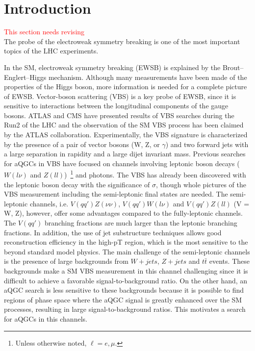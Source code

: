 \chapter{Introduction}

\textcolor{red}{This section needs revising}\\
The probe of the electroweak symmetry breaking is one of the most important topics of the LHC experiments.

In the SM, electroweak symmetry breaking (EWSB) is explained by the Brout–Englert–Higgs mechanism.%
Although many measurements have been made of the properties of the Higgs boson, more information is needed for a complete picture of EWSB. Vector-boson scattering (VBS) is a key probe of EWSB, since it is sensitive to interactions between the longitudinal components of the gauge bosons.
ATLAS and CMS have presented results of VBS searches during the Run2 of the LHC \cite{STDM-2017-19,CMS-SMP-20-001} and the observation of the SM VBS process has been claimed by the ATLAS collaboration.
Experimentally, the VBS signature is characterized by the presence of a pair of vector bosons (W, Z, or $\gamma$) and two forward jets with a large separation in rapidity and a large dijet invariant mass. Previous searches for aQGCs in VBS have focused on channels involving leptonic boson decays ($W(l\nu)$ and $Z(ll)$)~\footnote{Unless otherwise noted, $\ell=e,\mu$.} and photons.
The VBS has already been discovered with the leptonic boson decay with the significance of $\sigma$, though whole pictures of the VBS measurement including the semi-leptonic final states are needed.
The semi-leptonic channels, i.e. $V(qq')Z(\nu\nu)$, $V(qq')W(l\nu)$ and $V(qq')Z(ll)$ (V = W, Z), however, offer some advantages compared to the fully-leptonic channels. The $V(qq')$ branching fractions are much larger than the leptonic branching fractions. In addition, the use of jet substructure techniques allows good reconstruction efficiency in the high-pT region, which is the most sensitive to the beyond standard model physics.
The main challenge of the semi-leptonic channels is the presence of large backgrounds from $W + jets$, $Z + jets$ and $t\bar{t}$ events. These backgrounds make a SM VBS measurement in this channel challenging since it is difficult to achieve a favorable signal-to-background ratio. On the other hand, an aQGC search is less sensitive to these backgrounds because it is possible to find regions of phase space where the aQGC signal is greatly enhanced over the SM processes, resulting in large signal-to-background ratios. This motivates a search for aQGCs in this channels.

